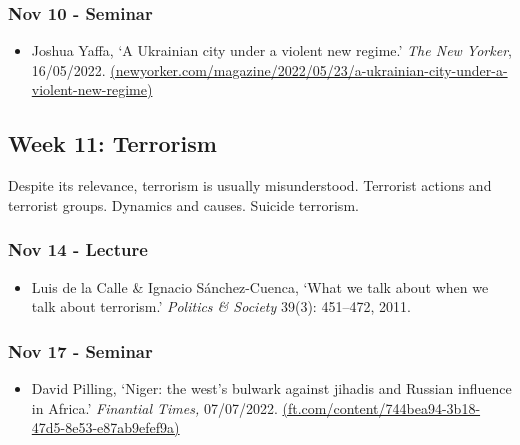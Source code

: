 \documentclass[12pt, a4paper]{article}
\begin{document}
\subsubsection*{Nov 10 - Seminar}

\begin{itemize}
\setlength\itemsep{-5pt}
\item Joshua Yaffa, `A Ukrainian city under a violent new regime.' \textit{The New Yorker}, 16/05/2022. \href{https://www.newyorker.com/magazine/2022/05/23/a-ukrainian-city-under-a-violent-new-regime}{(newyorker.com/magazine/2022/05/23/a-ukrainian-city-under-a-violent-new-regime)}
\end{itemize}


\hline %

\subsection*{Week 11: Terrorism}

Despite its relevance, terrorism is usually misunderstood. Terrorist actions and terrorist groups. Dynamics and causes. Suicide terrorism.

\subsubsection*{Nov 14 - Lecture}

\begin{itemize}
\setlength\itemsep{0pt}
\item Luis de la Calle \& Ignacio Sánchez-Cuenca, `What we talk about when we talk about terrorism.' \textit{Politics \& Society} 39(3): 451--472, 2011.
\end{itemize}

\subsubsection*{Nov 17 - Seminar}

\begin{itemize}
\setlength\itemsep{0pt}
\item David Pilling, `Niger: the west's bulwark against jihadis and Russian influence in Africa.' \textit{Finantial Times,} 07/07/2022. \href{https://www.ft.com/content/744bea94-3b18-47d5-8e53-e87ab9efef9a}{(ft.com/content/744bea94-3b18-47d5-8e53-e87ab9efef9a)}
\end{itemize}

\hline %
\end{document}
